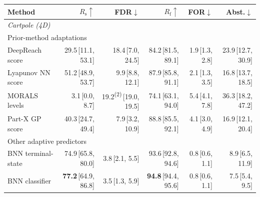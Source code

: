 \begin{tabular}{lrrrrr}
\toprule
\textbf{Method} & $R_{\mathrm{s}}\uparrow$ & FDR$\downarrow$ & $R_{\mathrm{f}}\uparrow$ & FOR$\downarrow$ & Abst.$\downarrow$ \\
\midrule
\multicolumn{6}{l}{\textit{Cartpole (4D)}} \\
\multicolumn{6}{l}{\footnotesize\color{black!55} Prior-method adaptations} \\
DeepReach score & 29.5\,{\scriptsize\color{black!55}[11.1, 53.1]} & 18.4\,{\scriptsize\color{black!55}[7.0, 24.5]} & 84.2\,{\scriptsize\color{black!55}[81.5, 89.1]} & 1.9\,{\scriptsize\color{black!55}[1.3, 2.8]} & 23.9\,{\scriptsize\color{black!55}[12.7, 30.9]} \\
Lyapunov NN score & 51.2\,{\scriptsize\color{black!55}[48.9, 53.7]} & 9.9\,{\scriptsize\color{black!55}[8.8, 12.1]} & 87.9\,{\scriptsize\color{black!55}[85.8, 91.1]} & 2.1\,{\scriptsize\color{black!55}[1.3, 3.5]} & 16.8\,{\scriptsize\color{black!55}[13.7, 18.5]} \\
MORALS levels & 3.1\,{\scriptsize\color{black!55}[0.0, 8.7]} & 19.2\textsuperscript{(2)}\,{\scriptsize\color{black!55}[19.0, 19.5]} & 74.1\,{\scriptsize\color{black!55}[63.1, 94.0]} & 5.4\,{\scriptsize\color{black!55}[4.1, 7.8]} & 36.3\,{\scriptsize\color{black!55}[18.2, 47.2]} \\
Part-X GP score & 40.3\,{\scriptsize\color{black!55}[24.7, 49.4]} & 7.9\,{\scriptsize\color{black!55}[3.2, 10.9]} & 88.8\,{\scriptsize\color{black!55}[85.5, 92.1]} & 4.1\,{\scriptsize\color{black!55}[3.0, 4.9]} & 16.9\,{\scriptsize\color{black!55}[12.1, 20.4]} \\
\multicolumn{6}{l}{\footnotesize\color{black!55} Other adaptive predictors} \\
BNN terminal-state & 74.9\,{\scriptsize\color{black!55}[65.8, 80.0]} & 3.8\,{\scriptsize\color{black!55}[2.1, 5.5]} & 93.6\,{\scriptsize\color{black!55}[92.8, 94.6]} & 0.8\,{\scriptsize\color{black!55}[0.6, 1.1]} & 8.9\,{\scriptsize\color{black!55}[6.5, 11.9]} \\
BNN classifier & \textbf{77.2}\,{\scriptsize\color{black!55}[64.9, 86.8]} & 3.5\,{\scriptsize\color{black!55}[1.3, 5.9]} & \textbf{94.8}\,{\scriptsize\color{black!55}[94.4, 95.6]} & 0.8\,{\scriptsize\color{black!55}[0.6, 1.1]} & 7.5\,{\scriptsize\color{black!55}[5.4, 9.5]} \\

\end{tabular}
